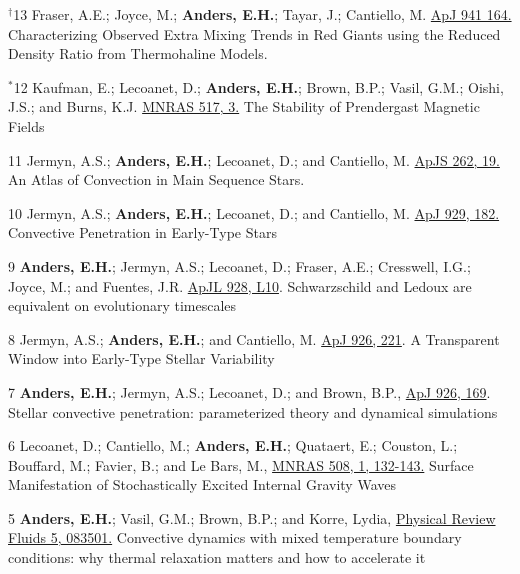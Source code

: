       {$^\dagger$13}
      {
        Fraser, A.E.; Joyce, M.; \textbf{Anders, E.H.}; Tayar, J.; Cantiello, M. 
        \href{https://iopscience.iop.org/article/10.3847/1538-4357/aca024}{ApJ 941 164.}
      }
      {Characterizing Observed Extra Mixing Trends in Red Giants using the Reduced Density Ratio from Thermohaline Models.}

\cvpub{}
      {$^*$12}
      {
        Kaufman, E.; Lecoanet, D.; \textbf{Anders, E.H.}; Brown, B.P.; Vasil, G.M.; Oishi, J.S.; and Burns, K.J.
        \href{https://academic.oup.com/mnras/article/517/3/3332/6748231?login=true}{MNRAS 517, 3.}
      }
      {The Stability of Prendergast Magnetic Fields}

\cvpub{}
	  {11}
	  {
		Jermyn, A.S.; \textbf{Anders, E.H.}; Lecoanet, D.; and Cantiello, M.
        \href{https://iopscience.iop.org/article/10.3847/1538-4365/ac7cee}{ApJS 262, 19.}
       }
	  {An Atlas of Convection in Main Sequence Stars.}

\cvpub{}
	  {10}
	  {
		Jermyn, A.S.; \textbf{Anders, E.H.}; Lecoanet, D.; and Cantiello, M. 
        \href{https://iopscience.iop.org/article/10.3847/1538-4357/ac5f08}{ApJ 929, 182.}
	  }
	  {Convective Penetration in Early-Type Stars}

\cvpub{}
	  {9}
	  {
		\textbf{Anders, E.H.}; Jermyn, A.S.; Lecoanet, D.; Fraser, A.E.; Cresswell, I.G.; Joyce, M.; and Fuentes, J.R. 
        \href{https://iopscience.iop.org/article/10.3847/2041-8213/ac5cb5}{ApJL 928, L10}.
	  }
	  {Schwarzschild and Ledoux are equivalent on evolutionary timescales}

\cvpub{}
	  {8}
	  {
		Jermyn, A.S.; \textbf{Anders, E.H.}; and Cantiello, M. 
        \href{https://iopscience.iop.org/article/10.3847/1538-4357/ac4e89}{ApJ 926, 221}.
	  }
	  {A Transparent Window into Early-Type Stellar Variability}

\cvpub{}
	  {7}
	  {
		\textbf{Anders, E.H.}; Jermyn, A.S.; Lecoanet, D.; and Brown, B.P., 
        \href{https://iopscience.iop.org/article/10.3847/1538-4357/ac408d}{ApJ 926, 169}.
	  }
	  {Stellar convective penetration: parameterized theory and dynamical simulations}

\cvpub{}
	  {6}
	  {
		Lecoanet, D.; Cantiello, M.; \textbf{Anders, E.H.}; Quataert, E.; Couston, L.; Bouffard, M.; Favier, B.; and Le Bars, M.,
          \href{https://doi.org/10.1093/mnras/stab2524}{MNRAS 508, 1, 132-143.}
	  }
	  {Surface Manifestation of Stochastically Excited Internal Gravity Waves}

	  {5}
	  {
		  \textbf{Anders, E.H.}; Vasil, G.M.; Brown, B.P.; and Korre, Lydia, 
		  \href{https://journals.aps.org/prfluids/abstract/10.1103/PhysRevFluids.5.083501}{Physical Review Fluids 5, 083501.}
	  }
	  {Convective dynamics with mixed temperature boundary conditions: why thermal relaxation matters and how to accelerate it}

